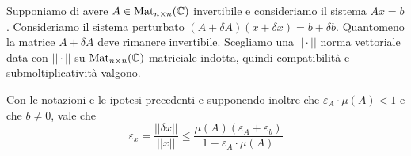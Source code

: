 \documentclass[a4paper]{article}
\begin{document}
Supponiamo di avere \(A \in \operatorname{Mat}_{n \times n}(\mathbb{C})\)
invertibile e consideriamo il sistema \(Ax = b\).
Consideriamo il sistema perturbato \((A + \delta A)(x + \delta x) = b + \delta b\).
Quantomeno la matrice \(A + \delta A\) deve rimanere invertibile.
Scegliamo una \(||\cdot||\) norma vettoriale data con
\(||\cdot||\) su \(\operatorname{Mat}_{n\times n}(\mathbb{C})\)
matriciale indotta, quindi compatibilità e submoltiplicatività
valgono.

\begin{snippettheorem}{}
    Con le notazioni e le ipotesi precedenti e supponendo inoltre che
    \(\varepsilon_A \cdot \mu(A) < 1\) e che \(b \neq 0\), vale che
    \[
        \varepsilon_x = \frac{||\delta x||}{||x||}
        \leq \frac{\mu(A)(\varepsilon_A + \varepsilon_b)}{1 - \varepsilon_A \cdot \mu(A)}
    \]
\end{snippettheorem}
\end{document}
